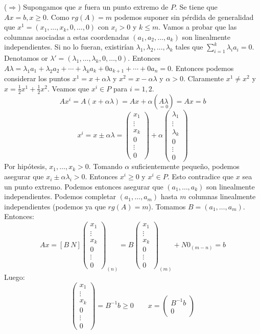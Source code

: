 \documentclass[PM.tex]{subfiles}
\begin{document}
\begin{dem}
($\Rightarrow$) Supongamos que $x$ fuera un punto extremo de $P$. Se tiene que $Ax=b, x ≥ 0$. Como $rg(A) = m$ podemos suponer sin pérdida de generalidad que $x^1 =(x_1,\dots,x_k,0,\dots,0)$ con $x_i > 0$ y $k ≤ m$.
Vamos a probar que las columnas asociadas a estas coordenadas $(a_1, a_2, \dots, a_k)$ son linealmente independientes. Si no lo fueran, existirían $λ_1,λ_2, \dots, λ_k$ tales que $\sum_{i=1}^k λ_i a_i = 0$. Denotamos or $λ' =(λ_1,\dots,λ_k,0,\dots,0)$. Entonces $Aλ=λ_1a_1 + λ_2a_2 + \cdots + λ_ka_k + 0a_{k+1}+\cdots+0a_n = 0$. Entonces podemos considerar los puntos $x^1 = x+αλ$ y $x^2 = x-αλ$ y $α > 0$. Claramente $x^1 \neq x^2$ y $x = \frac{1}{2}x^1+ \frac{1}{2}x^2$. Veamos que $x^i \in P$ para $i=1,2$.
\[ Ax^i = A(x + αλ) = Ax + α(\underset{=0}{Aλ}) = Ax = b \]
\[ x^i = x \pm αλ = \begin{pmatrix}x_1\\\vdots\\x_k\\0\\\vdots\\0\end{pmatrix} + α \begin{pmatrix}λ_1\\\vdots\\λ_k\\0\\\vdots\\0\end{pmatrix} \]
Por hipótesis, $x_1,\dots,x_k > 0$. Tomando $α$ suficientemente pequeño, podemos asegurar que $x_i \pm αλ_i > 0$. Entonces $x^i \geq 0$ y $x^i \in P$. Esto contradice que $x$ sea un punto extremo. Podemos entonces asegurar que $(a_1,\dots,a_k)$ son linealmente independientes. Podemos completar $(a_1,\dots,a_m)$ hasta $m$ columnas linealmente independientes (podemos ya que $rg(A) = m$). Tomamos $B = (a_1,\dots,a_m)$. Entonces:
\[ Ax =[B\ N]\begin{pmatrix}x_1\\\vdots\\x_k\\0\\\vdots\\0\end{pmatrix}_{(n)} = B \begin{pmatrix}x_1\\\vdots\\x_k\\0\\\vdots\\0\end{pmatrix}_{(m)} +N0_{(m-n)} = b \]
Luego: \[ \begin{pmatrix}x_1\\\vdots\\x_k\\0\\\vdots\\0\end{pmatrix} = B^{-1}b \geq 0 \qquad x = \begin{pmatrix}B^{-1}b\\0\end{pmatrix} \]
\end{dem}
\end{document}
